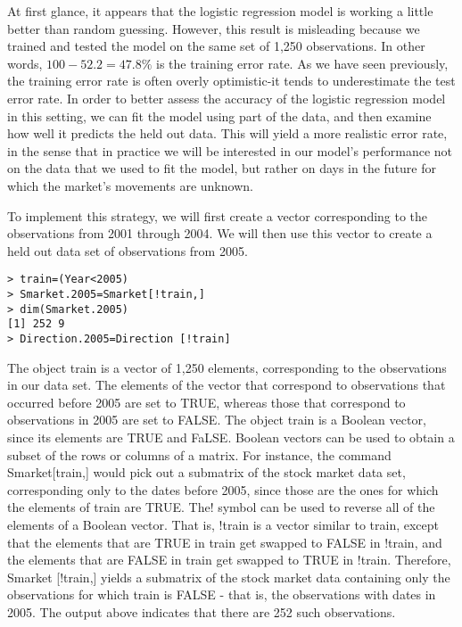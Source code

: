 \documentclass[10pt]{article}
\begin{document}
At first glance, it appears that the logistic regression model is working a little better than random guessing. However, this result is misleading because we trained and tested the model on the same set of 1,250 observations. In other words, $100-52.2=47.8 \%$ is the training error rate. As we have seen previously, the training error rate is often overly optimistic-it tends to underestimate the test error rate. In order to better assess the accuracy of the logistic regression model in this setting, we can fit the model using part of the data, and then examine how well it predicts the held out data. This will yield a more realistic error rate, in the sense that in practice we will be interested in our model's performance not on the data that we used to fit the model, but rather on days in the future for which the market's movements are unknown.


To implement this strategy, we will first create a vector corresponding to the observations from 2001 through 2004. We will then use this vector to create a held out data set of observations from 2005.

\begin{verbatim}
> train=(Year<2005)
> Smarket.2005=Smarket[!train,]
> dim(Smarket.2005)
[1] 252 9
> Direction.2005=Direction [!train]
\end{verbatim}

The object train is a vector of 1,250 elements, corresponding to the observations in our data set. The elements of the vector that correspond to observations that occurred before 2005 are set to TRUE, whereas those that correspond to observations in 2005 are set to FALSE. The object train is a Boolean vector, since its elements are TRUE and FaLSE. Boolean vectors can be used to obtain a subset of the rows or columns of a matrix. For instance, the command Smarket[train,] would pick out a submatrix of the stock market data set, corresponding only to the dates before 2005, since those are the ones for which the elements of train are TRUE. The! symbol can be used to reverse all of the elements of a Boolean vector. That is, !train is a vector similar to train, except that the elements that are TRUE in train get swapped to FALSE in !train, and the elements that are FALSE in train get swapped to TRUE in !train. Therefore, Smarket [!train,] yields a submatrix of the stock market data containing only the observations for which train is FALSE - that is, the observations with dates in 2005. The output above indicates that there are 252 such observations.
\end{document}
